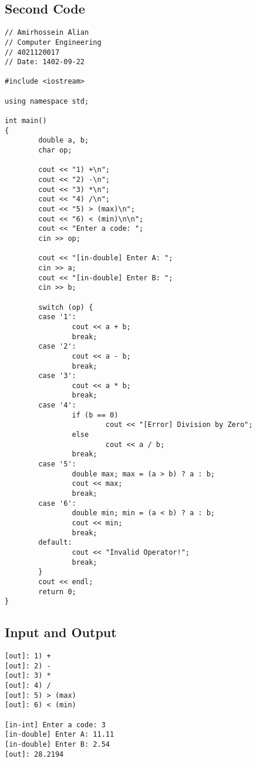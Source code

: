\documentclass[12pt]{article}
\begin{document}
        \subsection{Second Code}
   \begin{tcolorbox}[breakable, size=fbox, boxrule=1pt, pad at break*=1mm, colback=cellbackground, colframe=cellborder]
\begin{verbatim}
// Amirhossein Alian
// Computer Engineering
// 4021120017
// Date: 1402-09-22

#include <iostream>

using namespace std;

int main()
{
        double a, b;
        char op;
        
        cout << "1) +\n";
        cout << "2) -\n";
        cout << "3) *\n";
        cout << "4) /\n";
        cout << "5) > (max)\n";
        cout << "6) < (min)\n\n";
        cout << "Enter a code: ";
        cin >> op;

        cout << "[in-double] Enter A: ";
        cin >> a;
        cout << "[in-double] Enter B: ";
        cin >> b;

        switch (op) {
        case '1':
                cout << a + b;
                break;
        case '2':
                cout << a - b;
                break;
        case '3':
                cout << a * b;
                break;
        case '4':
                if (b == 0)
                        cout << "[Error] Division by Zero";
                else
                        cout << a / b;
                break;
        case '5':
                double max; max = (a > b) ? a : b; 
                cout << max;
                break;
        case '6':
                double min; min = (a < b) ? a : b; 
                cout << min;
                break;
        default:
                cout << "Invalid Operator!";
                break;
        } 
        cout << endl;
        return 0;
}
\end{verbatim}
\end{tcolorbox}

	\subsection{Input and Output}

    \begin{tcolorbox}[breakable, size=fbox, boxrule=1pt, pad at break*=1mm, colback=cellbackground!5!white, colframe=gray!75!black, title=Test Case 1]
\begin{Verbatim}[commandchars=\\\{\}]
[out]: 1) +
[out]: 2) -
[out]: 3) *
[out]: 4) /
[out]: 5) > (max)
[out]: 6) < (min)

[in-int] Enter a code: 3
[in-double] Enter A: 11.11
[in-double] Enter B: 2.54
[out]: 28.2194
\end{Verbatim}
\end{tcolorbox}
\end{document}
